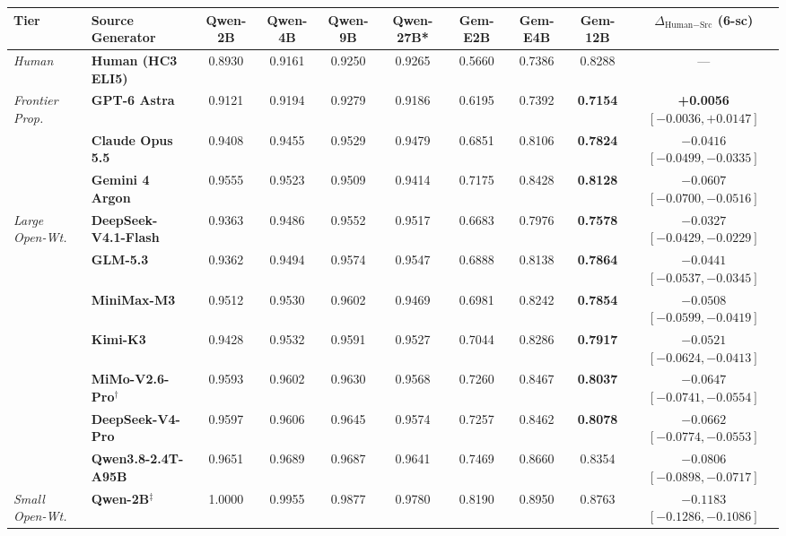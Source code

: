 \documentclass[11pt,a4paper,twocolumn]{article}
\begin{document}
\begin{table}[t]
\centering
\scriptsize
\setlength{\tabcolsep}{3.8pt}
\begin{tabular}{llcccccccc}
\toprule
\textbf{Tier} & \textbf{Source Generator} & \textbf{Qwen-2B} & \textbf{Qwen-4B} & \textbf{Qwen-9B} & \textbf{Qwen-27B*} & \textbf{Gem-E2B} & \textbf{Gem-E4B} & \textbf{Gem-12B} & \textbf{$\Delta_{\text{Human}-\text{Src}}$ (6-sc)} \\
\midrule
\textit{Human} & \textbf{Human (HC3 ELI5)} & 0.8930 & 0.9161 & 0.9250 & 0.9265 & 0.5660 & 0.7386 & 0.8288 & --- \\
\midrule
\multirow{3}{*}{\textit{Frontier Prop.}}
 & \textbf{GPT-6 Astra} & 0.9121 & 0.9194 & 0.9279 & 0.9186 & 0.6195 & 0.7392 & \textbf{0.7154} & \textbf{+0.0056} $[-0.0036, +0.0147]$ \\
 & \textbf{Claude Opus 5.5} & 0.9408 & 0.9455 & 0.9529 & 0.9479 & 0.6851 & 0.8106 & \textbf{0.7824} & $-0.0416$ $[-0.0499, -0.0335]$ \\
 & \textbf{Gemini 4 Argon} & 0.9555 & 0.9523 & 0.9509 & 0.9414 & 0.7175 & 0.8428 & \textbf{0.8128} & $-0.0607$ $[-0.0700, -0.0516]$ \\
\midrule
\multirow{7}{*}{\textit{Large Open-Wt.}}
 & \textbf{DeepSeek-V4.1-Flash} & 0.9363 & 0.9486 & 0.9552 & 0.9517 & 0.6683 & 0.7976 & \textbf{0.7578} & $-0.0327$ $[-0.0429, -0.0229]$ \\
 & \textbf{GLM-5.3} & 0.9362 & 0.9494 & 0.9574 & 0.9547 & 0.6888 & 0.8138 & \textbf{0.7864} & $-0.0441$ $[-0.0537, -0.0345]$ \\
 & \textbf{MiniMax-M3} & 0.9512 & 0.9530 & 0.9602 & 0.9469 & 0.6981 & 0.8242 & \textbf{0.7854} & $-0.0508$ $[-0.0599, -0.0419]$ \\
 & \textbf{Kimi-K3} & 0.9428 & 0.9532 & 0.9591 & 0.9527 & 0.7044 & 0.8286 & \textbf{0.7917} & $-0.0521$ $[-0.0624, -0.0413]$ \\
 & \textbf{MiMo-V2.6-Pro}$^{\dagger}$ & 0.9593 & 0.9602 & 0.9630 & 0.9568 & 0.7260 & 0.8467 & \textbf{0.8037} & $-0.0647$ $[-0.0741, -0.0554]$ \\
 & \textbf{DeepSeek-V4-Pro} & 0.9597 & 0.9606 & 0.9645 & 0.9574 & 0.7257 & 0.8462 & \textbf{0.8078} & $-0.0662$ $[-0.0774, -0.0553]$ \\
 & \textbf{Qwen3.8-2.4T-A95B} & 0.9651 & 0.9689 & 0.9687 & 0.9641 & 0.7469 & 0.8660 & 0.8354 & $-0.0806$ $[-0.0898, -0.0717]$ \\
\midrule
\multirow{7}{*}{\textit{Small Open-Wt.}}
 & \textbf{Qwen-2B}$^{\ddagger}$ & 1.0000 & 0.9955 & 0.9877 & 0.9780 & 0.8190 & 0.8950 & 0.8763 & $-0.1183$ $[-0.1286, -0.1086]$ \\

\end{tabular}
\end{table}
\end{document}
